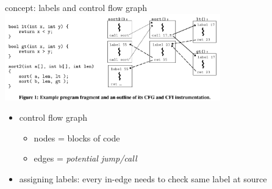 \usetikzlibrary{calc}
\begin{frame}{concept: labels and control flow graph}
\includegraphics[width=0.7\textwidth]{../cfi/abadi-fig1}
\begin{itemize}
\item control flow graph
    \begin{itemize}
    \item nodes = blocks of code
    \item edges = \textit{potential jump/call}
    \end{itemize}
\item assigning labels: every in-edge needs to check same label at source
\end{itemize}
\end{frame}

